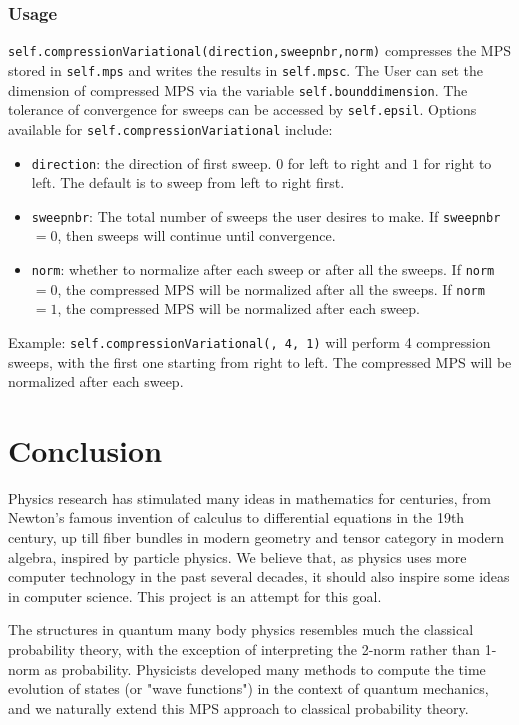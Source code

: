 \documentclass[english]{article}
\begin{document}
\subsubsection{Usage}
\texttt{self.compressionVariational(direction,sweep\textunderscore nbr,norm)} compresses the MPS stored in \texttt{self.mps} and writes the results in \texttt{self.mpsc}. The User can set the dimension of compressed MPS via the variable \texttt{self.bound\textunderscore dimension}. The tolerance of convergence for sweeps can be accessed by \texttt{self.epsil}.  Options available for \texttt{self.compressionVariational} include:
\begin{itemize}
\item \texttt{direction}: the direction of first sweep. $0$ for left to right and $1$ for right to left. The default is to sweep from left to right first.
\item \texttt{sweep\textunderscore nbr}: The total number of sweeps the user desires to make. If  \texttt{sweep\textunderscore nbr}$ =0$, then sweeps will continue until convergence.
\item \texttt{norm}: whether to normalize after each sweep or after all the sweeps. If \texttt{norm} $=0$, the compressed MPS will be normalized after all the sweeps. If \texttt{norm} $=1$, the compressed MPS will be normalized after each sweep.
\end{itemize}
Example: \texttt{self.compressionVariational(, 4, 1)} will perform 4 compression sweeps, with the first one starting from right to left. The compressed MPS will be normalized after each sweep.



\section{Conclusion}
Physics research has stimulated many ideas in mathematics for centuries, from Newton's famous invention of calculus to differential equations in the 19th century, up till fiber bundles in modern geometry and tensor category in modern algebra, inspired by particle physics. We believe that, as physics uses more computer technology in the past several decades, it should also inspire some ideas in computer science. This project is an attempt for this goal.

The structures in quantum many body physics resembles much the classical probability theory, with the exception of interpreting the 2-norm rather than 1-norm as probability. Physicists developed many methods to compute the time evolution of states (or "wave functions") in the context of quantum mechanics, and we naturally extend this MPS approach to classical probability theory.
\end{document}
